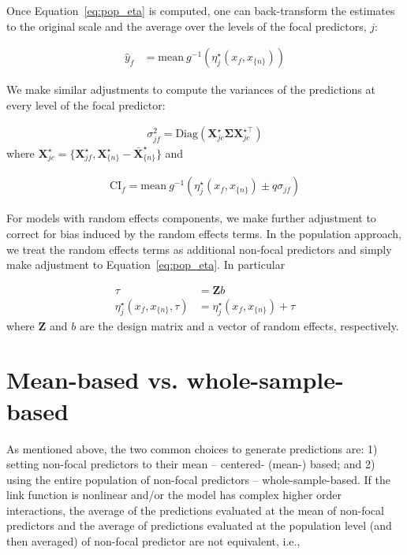 \documentclass[10pt,letterpaper]{article}
\newcommand{\bX}{{\mathbf X}}
\newcommand{\bZ}{{\mathbf Z}}
\newcommand{\nset}[1]{#1_{\{n\}}}
\begin{document}
Once Equation~\ref{eq:pop_eta} is computed, one can back-transform the estimates to the original scale and the average over the levels of the focal predictors, $j$:

\begin{align}\label{eq:pop_response} 
\hat{y}_f  &= \textrm{mean} ~ g^{-1} \left(\eta_j^\star(x_f, \nset{x})\right)
\end{align}

We make similar adjustments to compute the variances of the predictions at every level of the focal predictor:

\begin{align}
\sigma_{jf}^2 = \textrm{Diag}(\bX^\star_{jc} \boldsymbol{\Sigma} \bX^{\star\top}_{jc})
\end{align}
where $\bX^{\star}_{jc} = \{\bX_{jf}^\star, \nset{{\bX}^\star} - \nset{{\bar{\bX}}^\star}\}$ and 

\begin{align}
\mathrm{CI}_f = \mathrm{mean} ~ g^{-1} \left(\eta_j^\star(x_f, \nset{x}) \pm q\sigma_{jf}\right)
\end{align}

For models with random effects components, we make further adjustment to correct for bias induced by the random effects terms. In the population approach, we treat the random effects terms as additional non-focal predictors and simply make adjustment to Equation~\ref{eq:pop_eta}. In particular

\begin{align}\label{eq:pop_eta_re} 
\tau &= \bZ b \nonumber \\
\eta_j^\star(x_f, \nset{x}, \tau)  &= \eta_j^\star(x_f, \nset{x}) + \tau
\end{align}
where $\bZ$ and $b$ are the design matrix and a vector of random effects, respectively.

\section*{Mean-based vs. whole-sample-based}

As mentioned above, the two common choices to generate predictions are: 1) setting non-focal predictors to their mean -- centered- (mean-) based; and 2) using the entire population of non-focal predictors -- whole-sample-based. If the link function is nonlinear and/or the model has complex higher order interactions, the average of the predictions evaluated at the mean of non-focal predictors and the average of predictions evaluated at the population level (and then averaged) of non-focal predictor are not equivalent, i.e.,
\end{document}
